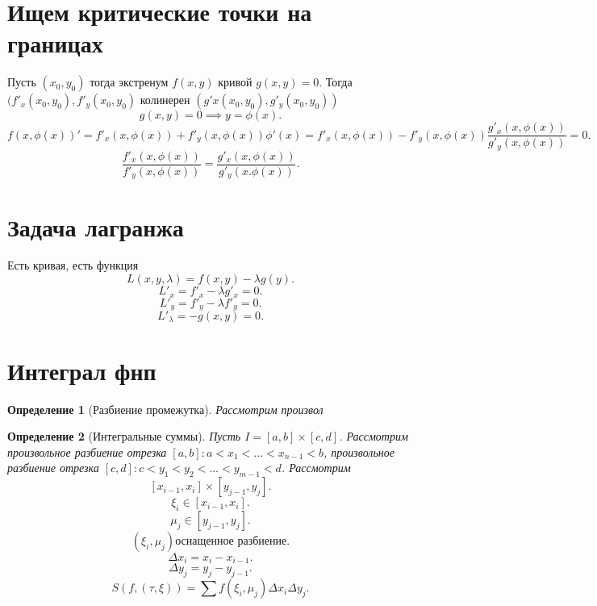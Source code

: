 \documentclass[14pt]{extarticle} \usepackage{fontspec}
\newtheorem{definition}{Определение}
\begin{document}
\section{Ищем критические точки на границах}
Пусть $(x_0,y_0)$ тогда экстренум $f(x,y)$ кривой  $g(x,y) = 0$. 
Тогда  $(f'_{x} (x_0,y_0),f'_{y}(x_0,y_0)$ колинерен $( g'x(x_0,y_0),g'_{y}(x_0,y_0) )$
\[
g(x,y) = 0 \implies y = \phi(x)
.\] 
\[
f(x,\phi(x))' = f'_{x}(x,\phi(x))  + f'_{y}(x,\phi(x)) \phi'(x) = 
f'_{x}(x,\phi(x)) - f'_{y}(x,\phi(x)) \frac{g'_{x}(x,\phi(x))}{g'_{y}(x,\phi(x))} = 0
.\]
\[
\frac{f'_{x}(x,\phi(x))}{f'_{y}(x,\phi(x))} = \frac{g'_{x}(x,\phi(x))}{g'_{y}(x.\phi(x))}
.\] 
\section{Задача лагранжа}
Есть кривая, есть функция
 \[
L(x,y,\lambda) = f(x,y) - \lambda g(y)
.\] 
\[
L'_{x}  = f'_{x} - \lambda g'_{x} =  0
.\] 
\[
    L'_{y} = f'_{y} - \lambda f'_{y} = 0
.\] 
\[
L'_{\lambda} = -g(x,y) = 0
.\] 
\section{Интеграл фнп}
\begin{definition}[Разбиение промежутка]
    Рассмотрим произвол
\end{definition}
\begin{definition}[Интегральные суммы]
    Пусть $I = [a,b] \times [c,d]$. Рассмотрим произвольное разбиение отрезка $[a,b]: a < x_1 < \dots< x_{n - 1} < b$, произвольное разбиение отрезка $[c,d] :
    c < y_1 < y_2 < \dots < y_{m-1} < d$. Рассмотрим 
    \[
        [x_{i -1},x_{i}] \times [y_{j -1},y_{j}]
    .\] 
    \[
        \xi_{i} \in [x_{i - 1},x_{i}]
    .\]
    \[
        \mu_{j}  \in [y_{j -1},y_{j}]
    .\] 
    \[
        (\xi_{i},\mu_{j})  \text{оснащенное разбиение}
    .\] 
    \[
    \Delta x_{i} = x_{i} - x_{i - 1}
    .\] 
    \[
    \Delta y_{j} = y_{j} - y_{j-1}
    .\] 
    \[
    S(f,( \tau,\xi )) = \sum f(\xi_{i},\mu_{j}) \Delta x_{i} \Delta y_{j}
    .\] 
\end{definition}
\end{document}

